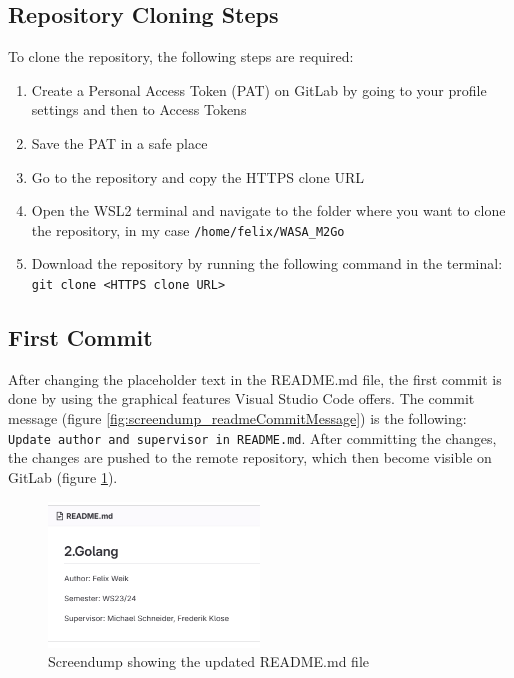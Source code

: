 \subsection{Repository Cloning Steps}
To clone the repository, the following steps are required:
\begin{enumerate}
    \item Create a Personal Access Token (PAT) on GitLab by going to your profile settings and then to Access Tokens
    \item Save the PAT in a safe place
    \item Go to the repository and copy the HTTPS clone URL
    \item Open the WSL2 terminal and navigate to the folder where you want to clone the repository, in my case \texttt{/home/felix/WASA\_M2Go}
    \item Download the repository by running the following command in the terminal: \texttt{git clone <HTTPS clone URL>}
\end{enumerate}

\subsection{First Commit}
After changing the placeholder text in the README.md file, the first commit is done by using the graphical features Visual Studio Code offers.
The commit message (figure \ref*{fig:screendump_readmeCommitMessage}) is the following: \texttt{Update author and supervisor in README.md}.
After committing the changes, the changes are pushed to the remote repository, which then become visible on GitLab (figure \ref*{fig:screendump_readme}).

\begin{figure}[h]
    \centering
    \includegraphics[width=0.5\textwidth]{figures/goLang/golang_screendumpReadme.png}
    \caption{Screendump showing the updated README.md file}
    \label{fig:screendump_readme}
\end{figure}

